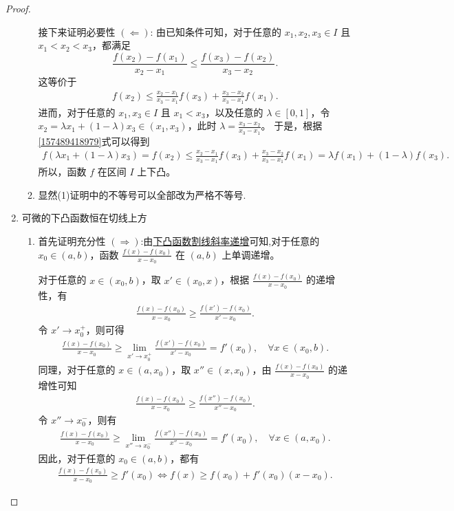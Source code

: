 \documentclass[../../main.tex]{subfiles}
\begin{document}
\begin{proof}
\begin{enumerate}
\begin{enumerate}[(1)]
接下来证明必要性 $(\Leftarrow)$:
由已知条件可知，对于任意的 $x_1, x_2, x_3 \in I$ 且 $x_1 < x_2 < x_3$，都满足
\[
\frac{f(x_2) - f(x_1)}{x_2 - x_1} \leqslant \frac{f(x_3) - f(x_2)}{x_3 - x_2}.
\]
这等价于
\begin{align}
f(x_2) \leqslant \frac{x_2 - x_1}{x_3 - x_1} f(x_3) + \frac{x_3 - x_2}{x_3 - x_1} f(x_1). \label{157489418979}
\end{align}
进而，对于任意的 $x_1, x_3 \in I$ 且 $x_1 < x_3$，以及任意的 $\lambda \in [0, 1]$，令 $x_2 = \lambda x_1 + (1 - \lambda) x_3 \in (x_1, x_3)$，此时 $\lambda = \frac{x_3 - x_2}{x_3 - x_1}$。
于是，根据\eqref{157489418979}式可以得到
\begin{align*}
f(\lambda x_1 + (1 - \lambda) x_3) = f(x_2) 
\leqslant \frac{x_2 - x_1}{x_3 - x_1} f(x_3) + \frac{x_3 - x_2}{x_3 - x_1} f(x_1) 
= \lambda f(x_1) + (1 - \lambda) f(x_3).
\end{align*}
所以，函数 $f$ 在区间 $I$ 上下凸。

\item 显然(1)证明中的不等号可以全部改为严格不等号.
\end{enumerate}

\item {\heiti 可微的下凸函数恒在切线上方}\begin{enumerate}[(1)]
\item 首先证明充分性 $(\Rightarrow)$:由\hyperref[下凸函数割线斜率递增]{下凸函数割线斜率递增}可知,对于任意的 $x_0\in (a,b)$，函数 $\frac{f(x) - f(x_0)}{x - x_0}$ 在 $(a,b)$ 上单调递增。

对于任意的 $x\in (x_0,b)$，取 $x'\in (x_0,x)$，根据 $\frac{f(x) - f(x_0)}{x - x_0}$ 的递增性，有
\begin{align*}
\frac{f(x) - f(x_0)}{x - x_0} \geqslant \frac{f(x') - f(x_0)}{x' - x_0}.
\end{align*}
令 $x'\to x_0^+$，则可得
\begin{align*}
\frac{f(x) - f(x_0)}{x - x_0} \geqslant \lim_{x'\to x_0^+}\frac{f(x') - f(x_0)}{x' - x_0}=f'(x_0),\quad \forall x\in (x_0,b).
\end{align*}
同理，对于任意的 $x\in (a,x_0)$，取 $x''\in (x,x_0)$，由 $\frac{f(x) - f(x_0)}{x - x_0}$ 的递增性可知
\begin{align*}
\frac{f(x) - f(x_0)}{x - x_0} \geqslant \frac{f(x'') - f(x_0)}{x'' - x_0}.
\end{align*}
令 $x''\to x_0^-$，则有
\begin{align*}
\frac{f(x) - f(x_0)}{x - x_0} \geqslant \lim_{x''\to x_0^-}\frac{f(x'') - f(x_0)}{x'' - x_0}=f'(x_0),\quad \forall x\in (a,x_0).
\end{align*}
因此，对于任意的 $x_0\in (a,b)$，都有
\begin{align*}
\frac{f(x) - f(x_0)}{x - x_0} \geqslant f'(x_0) \Leftrightarrow f(x)\geqslant f(x_0)+f'(x_0)(x - x_0).
\end{align*}


\end{enumerate}
\end{enumerate}
\end{proof}
\end{document}
